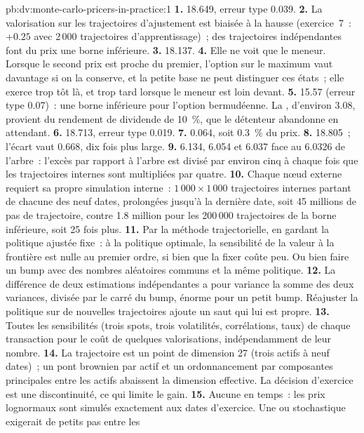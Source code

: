 \begin{solution}{pb:dv:monte-carlo-pricers-in-practice:1}
\textbf{1.} 18.649, erreur type 0.039.
\textbf{2.} La valorisation sur les trajectoires d'ajustement est biaisée à la hausse (exercice~7~: $+0.25$ avec 2\,000 trajectoires d'apprentissage)~; des trajectoires indépendantes font du prix une borne inférieure.
\textbf{3.} 18.137.
\textbf{4.} Elle ne voit que le meneur. Lorsque le second prix est proche du premier, l'option sur le maximum vaut davantage si on la conserve, et la petite base ne peut
distinguer ces états~; elle exerce trop tôt là, et trop tard lorsque le meneur est loin devant.
\textbf{5.} 15.57 (erreur type 0.07)~: une borne inférieure pour l'option bermudéenne. La , d'environ 3.08, provient du rendement de dividende de 10~\%, que le
détenteur abandonne en attendant.
\textbf{6.} 18.713, erreur type 0.019.
\textbf{7.} 0.064, soit 0.3~\% du prix.
\textbf{8.} 18.805~; l'écart vaut 0.668, dix fois plus large.
\textbf{9.} 6.134, 6.054 et 6.037 face au 6.0326 de l'arbre~: l'excès par rapport à l'arbre est divisé par environ cinq à chaque fois que les trajectoires internes sont multipliées par quatre.
\textbf{10.} Chaque nœud externe requiert sa propre simulation interne~: $1\,000\times1\,000$ trajectoires internes partant de chacune des neuf dates, prolongées jusqu'à la dernière date,
soit 45 millions de pas de trajectoire, contre 1.8 million pour les 200\,000 trajectoires de la borne inférieure, soit 25 fois plus.
\textbf{11.} Par la méthode trajectorielle, en gardant la politique ajustée fixe~: à la politique optimale, la sensibilité de la valeur à la frontière est nulle au premier ordre, si bien que la fixer coûte
peu. Ou bien faire un bump avec des nombres aléatoires communs et la même politique.
\textbf{12.} La différence de deux estimations indépendantes a pour variance la somme des deux variances, divisée par le carré du bump, énorme pour un petit bump. Réajuster la
politique sur de nouvelles trajectoires ajoute un saut qui lui est propre.
\textbf{13.} Toutes les sensibilités (trois spots, trois volatilités, corrélations, taux) de chaque transaction pour le coût de quelques valorisations, indépendamment de leur nombre.
\textbf{14.} La trajectoire est un point de dimension 27 (trois actifs à neuf dates)~; un pont brownien par actif et un ordonnancement par composantes principales entre les actifs abaissent la
dimension effective. La décision d'exercice est une discontinuité, ce qui limite le gain.
\textbf{15.} Aucune en temps~: les prix lognormaux sont simulés exactement aux dates d'exercice. Une  ou stochastique exigerait de petits pas entre les

\end{solution}
